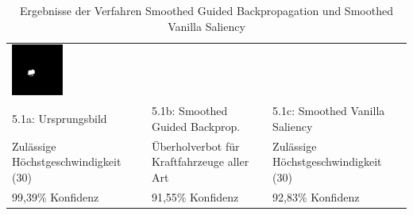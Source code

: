 \begin{table}
\begin{tabular}{p{4.5cm}p{4.5cm}p{4.5cm}}
		\includegraphics[width=\linewidth]{Images/AnPe/5_1_Rechts}\\ 
		5.1a: Ursprungsbild &5.1b: Smoothed Guided Backprop. &5.1c: Smoothed Vanilla Saliency \\
		Zulässige Höchstgeschwindigkeit (30) & Überholverbot für Kraftfahrzeuge aller Art& Zulässige Höchstgeschwindigkeit (30)\\
		99,39\% Konfidenz & 91,55\% Konfidenz & 92,83\% Konfidenz\\
		
	\end{tabular} 

	\caption{Ergebnisse der Verfahren Smoothed Guided Backpropagation und Smoothed Vanilla Saliency}
	\label{tab:sal1}
\end{table}

